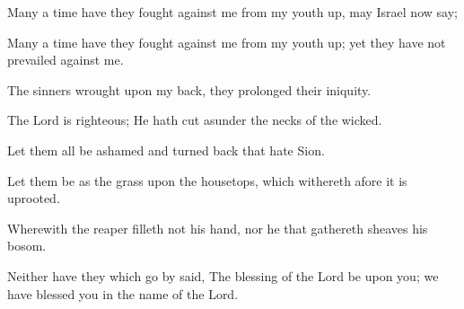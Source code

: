 Many a time have they fought against me from my youth up, may Israel now say;

Many a time have they fought against me from my youth up; yet they have not prevailed against me.

The sinners wrought upon my back, they prolonged their iniquity.

The Lord is righteous; He hath cut asunder the necks of the wicked.

Let them all be ashamed and turned back that hate Sion.

Let them be as the grass upon the housetops, which withereth afore it is uprooted.

Wherewith the reaper filleth not his hand, nor he that gathereth sheaves his bosom.

Neither have they which go by said, The blessing of the Lord be upon you; we have blessed you in the name of the Lord.
